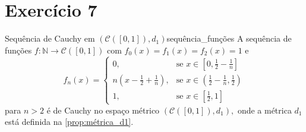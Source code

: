 \section*{Exercício 7}
\begin{proposition}{Sequência de Cauchy em \((\mathcal{C}([0,1]), d_1)\)}{sequência_funções}
    A sequência de funções \(f : \mathbb{N} \to \mathcal{C}([0,1])\) com \(f_0(x) = f_1(x) = f_2(x) = 1\) e
    \begin{equation*}
        f_n(x) = \begin{cases}
            0, & \text{se }x \in \left[0, \frac12 - \frac1n\right]\\
            n \left(x - \frac12 + \frac1n\right), & \text{se }x \in \left(\frac12 - \frac1n, \frac12\right)\\
            1, & \text{se }x \in \left[\frac12, 1\right]
        \end{cases}
    \end{equation*}
    para \(n > 2\) é de Cauchy no espaço métrico \((\mathcal{C}([0,1]), d_1),\) onde a métrica \(d_1\) está definida na \cref{prop:métrica_d1}.
\end{proposition}
